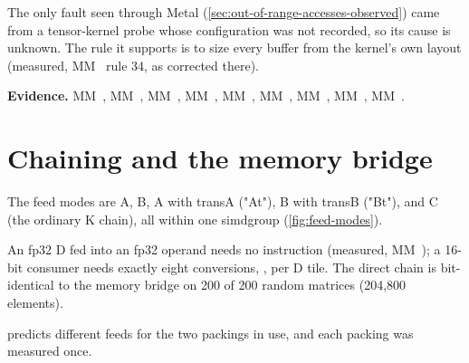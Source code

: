 The only fault seen through Metal (\cref{sec:out-of-range-accesses-observed}) came from a 
tensor-kernel probe whose configuration was not recorded, so its cause is unknown. The rule it supports is to size every
buffer from the kernel's own layout (measured, MM~ rule 34, as corrected there).

\textbf{Evidence.} MM~, MM~, MM~, MM~, MM~, MM~, MM~, MM~, MM~.

\section{Chaining and the memory bridge}\label{sec:chaining-feed-modes}

The feed modes are A, B, A with transA ("At"), B with transB ("Bt"), and C (the ordinary K chain), all within one
simdgroup (\cref{fig:feed-modes}).



An fp32 D fed into an fp32 operand needs no instruction (measured, MM~); a 16-bit consumer needs
exactly eight conversions, , per D tile. The direct chain is bit-identical to the
memory bridge on 200 of 200 random matrices (204,800 elements).

 predicts different feeds for the two packings in use, and each packing was measured
once.

